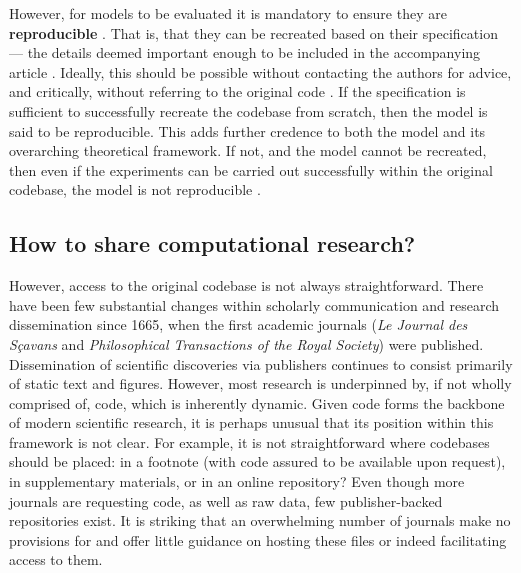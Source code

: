 \documentclass[jou]{apa6}
\begin{document}
However, for models to be evaluated
it is mandatory to ensure they are \textbf{reproducible} \cite{topalidou15}.  
That is, that they can be recreated based on their specification --- the details deemed important enough to be included in the accompanying article \cite{hinsen15}.
Ideally, this should be possible without contacting the authors for advice, and critically, without referring to the original code \cite{cooper14}.
If the specification is sufficient to successfully recreate the codebase from scratch, then the model is said to be reproducible.
This adds further credence to both the model and its overarching theoretical framework.
If not, and the model cannot be recreated, then even if the experiments can be carried out successfully within the original codebase, the model is not reproducible \cite{crook13}.

\subsection*{How to share computational research?}
However, access to the original codebase is not always straightforward.
There have been few substantial changes within scholarly communication and research dissemination since 1665, when the first academic journals (\textit{Le Journal des Sçavans} and \textit{Philosophical Transactions of the Royal Society}) were published.
Dissemination of scientific discoveries via publishers continues to consist primarily of static text and figures.
However, most research is underpinned by, if not wholly comprised of, code, which is inherently dynamic.
Given code forms the backbone of modern scientific research, it is perhaps unusual that its position within this framework is not clear.
For example, it is not straightforward where codebases should be placed: in a footnote (with code assured to be available upon request), in supplementary materials, or in an online repository?
Even though more journals are requesting code, as well as raw data, few publisher-backed repositories exist.
It is striking that an overwhelming number of journals make no provisions for and offer little guidance on hosting these files or indeed facilitating access to them.
\end{document}
